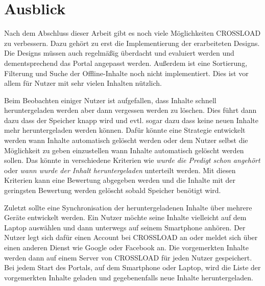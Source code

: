 \section{Ausblick}
Nach dem Abschluss dieser Arbeit gibt es noch viele Möglichkeiten CROSSLOAD zu verbessern. Dazu gehört zu erst die Implementierung der erarbeiteten Designs. Die Designs müssen auch regelmäßig überdacht und evaluiert werden und dementsprechend das Portal angepasst werden. Außerdem ist eine Sortierung, Filterung und Suche der Offline-Inhalte noch nicht implementiert. Dies ist vor allem für Nutzer mit sehr vielen Inhalten nützlich. 

Beim Beobachten einiger Nutzer ist aufgefallen, dass Inhalte schnell heruntergeladen werden aber dann vergessen werden zu löschen. Dies führt dann dazu dass der Speicher knapp wird und evtl. sogar dazu dass keine neuen Inhalte mehr heruntergeladen werden können. Dafür könnte eine Strategie entwickelt werden wann Inhalte automatisch gelöscht werden oder dem Nutzer selbst die Möglichkeit zu geben einzustellen wann Inhalte automatisch gelöscht werden sollen. Das könnte in verschiedene Kriterien wie \textit{wurde die Predigt schon angehört} oder \textit{wann wurde der Inhalt heruntergeladen} unterteilt werden. Mit diesen Kriterien kann eine Bewertung abgegeben werden und die Inhalte mit der geringsten Bewertung werden gelöscht sobald Speicher benötigt wird.

Zuletzt sollte eine Synchronisation der heruntergeladenen Inhalte über mehrere Geräte entwickelt werden. Ein Nutzer möchte seine Inhalte vielleicht auf dem Laptop auswählen und dann unterwegs auf seinem Smartphone anhören. Der Nutzer legt sich dafür einen Account bei CROSSLOAD an oder meldet sich über einen anderen Dienst wie Google oder Facebook an. Die vorgemerkten Inhalte werden dann auf einem Server von CROSSLOAD für jeden Nutzer gespeichert. Bei jedem Start des Portals, auf dem Smartphone oder Laptop, wird die Liste der vorgemerkten Inhalte geladen und gegebenenfalls neue Inhalte heruntergeladen. 
